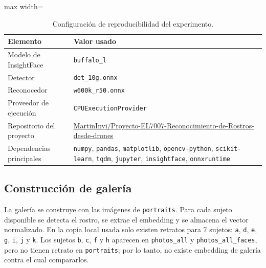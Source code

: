 \documentclass[11pt]{article}
\begin{document}
\begin{table}[H]
\centering
\caption{Configuración de reproducibilidad del experimento.}
\label{tab:reproducibilidad}
\begin{adjustbox}{max width=\textwidth}
\begin{tabular}{ll}
\toprule
Elemento & Valor usado \\
\midrule
Modelo de InsightFace & \texttt{buffalo\_l} \\
Detector & \texttt{det\_10g.onnx} \\
Reconocedor & \texttt{w600k\_r50.onnx} \\
Proveedor de ejecución & \texttt{CPUExecutionProvider} \\
Repositorio del proyecto & \href{https://github.com/MartinInvi/Proyecto-EL7007-Reconocimiento-de-Rostros-desde-drones}{MartinInvi/Proyecto-EL7007-Reconocimiento-de-Rostros-desde-drones} \\
Dependencias principales & \texttt{numpy}, \texttt{pandas}, \texttt{matplotlib}, \texttt{opencv-python}, \texttt{scikit-learn}, \texttt{tqdm}, \texttt{jupyter}, \texttt{insightface}, \texttt{onnxruntime} \\
\bottomrule
\end{tabular}
\end{adjustbox}
\end{table}

\subsection{Construcción de galería}

La galería se construye con las imágenes de \texttt{portraits}. Para cada sujeto disponible se detecta el rostro, se extrae el embedding y se almacena el vector normalizado. En la copia local usada solo existen retratos para 7 sujetos: \texttt{a}, \texttt{d}, \texttt{e}, \texttt{g}, \texttt{i}, \texttt{j} y \texttt{k}. Los sujetos \texttt{b}, \texttt{c}, \texttt{f} y \texttt{h} aparecen en \texttt{photos\_all} y \texttt{photos\_all\_faces}, pero no tienen retrato en \texttt{portraits}; por lo tanto, no existe embedding de galería contra el cual compararlos.
\end{document}
